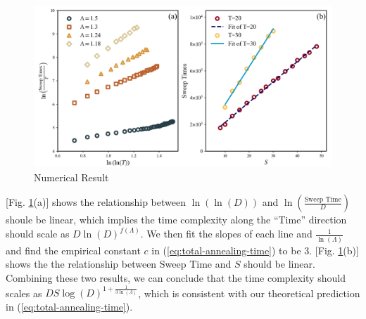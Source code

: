 \documentclass[twocolumn,superscriptaddress,english,showpacs,longbibliography]{revtex4-2}
\begin{document}
\begin{figure}[h]
    \centering
    \includegraphics[width=\columnwidth,keepaspectratio]{../notes/images/MainNumericalResult.png}
    \caption{Numerical Result}
    \label{fig:main-numerical-result}
\end{figure}

[Fig. \ref{fig:main-numerical-result}(a)] shows the relationship between
$\ln(\ln(D))$ and $\ln(\frac{\text{Sweep Time}}{D})$ shoule be linear, which implies 
the time complexity along the ``Time'' direction should scale as $D\ln(D)^{f(\Lambda)}$. 
We then fit the slopes of each line and $\frac{1}{\ln(\Lambda)}$ and find the 
empirical constant $c$ in (\ref{eq:total-annealing-time}) to be $3$. [Fig. \ref{fig:main-numerical-result}(b)] shows 
the the relationship between Sweep Time and $S$ should be linear. Combining these two results, 
we can conclude that the time complexity should scales as $DS\log(D)^{1+\frac{1}{3\ln(\Lambda)}}$, 
which is consistent with our theoretical prediction in (\ref{eq:total-annealing-time}).
\end{document}

